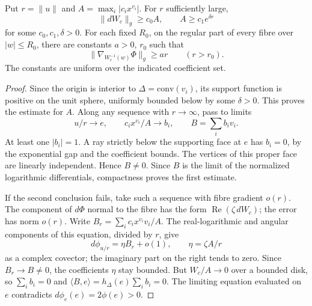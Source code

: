 \begin{lemma}\label{lem:rayest}
Put $r=\|u\|$ and $A=\max_i |c_i x^{v_i}|$. For $r$ sufficiently large,
\[
       \|dW_c\|_g\ge c_0 A,\qquad A\ge c_1 e^{\delta r}
\]
for some $c_0,c_1,\delta>0$. For each fixed $R_0$, on the regular part of every fibre over $|w|\le R_0$, there are constants $a>0$, $r_0$ such that
\[
                      \|\nabla_{W_c^{-1}(w)}\Phi\|_g\ge a r
                      \qquad (r>r_0).
\]
The constants are uniform over the indicated coefficient set.
\end{lemma}
\begin{proof}
Since the origin is interior to $\Delta=\mathrm{conv}(v_i)$, its support function is positive on the unit sphere, uniformly bounded below by some $\delta>0$. This proves the estimate for $A$. Along any sequence with $r\to\infty$, pass to limits
\[
    u/r\longrightarrow e,\qquad c_ix^{v_i}/A\longrightarrow b_i,
       \qquad B=\sum_i b_i v_i .
\]
At least one $|b_i|=1$. A ray strictly below the supporting face at $e$ has $b_i=0$, by the exponential gap and the coefficient bounds. The vertices of this proper face are linearly independent. Hence $B\ne0$. Since $B$ is the limit of the normalized logarithmic differentials, compactness proves the first estimate.

If the second conclusion fails, take such a sequence with fibre gradient $o(r)$. The component of $d\Phi$ normal to the fibre has the form $\operatorname{Re}(\zeta\,dW_c)$; the error has norm $o(r)$. Write $B_r=\sum_i c_ix^{v_i}v_i/A$. The real-logarithmic and angular components of this equation, divided by $r$, give
\[
             d\phi_{u/r}=\eta B_r+o(1),\qquad \eta=\zeta A/r
\]
as a complex covector; the imaginary part on the right tends to zero. Since $B_r\to B\ne0$, the coefficients $\eta$ stay bounded. But $W_c/A\to0$ over a bounded disk, so $\sum_i b_i=0$ and $\langle B,e\rangle=h_\Delta(e)\sum_i b_i=0$. The limiting equation evaluated on $e$ contradicts $d\phi_e(e)=2\phi(e)>0$.
\end{proof}

